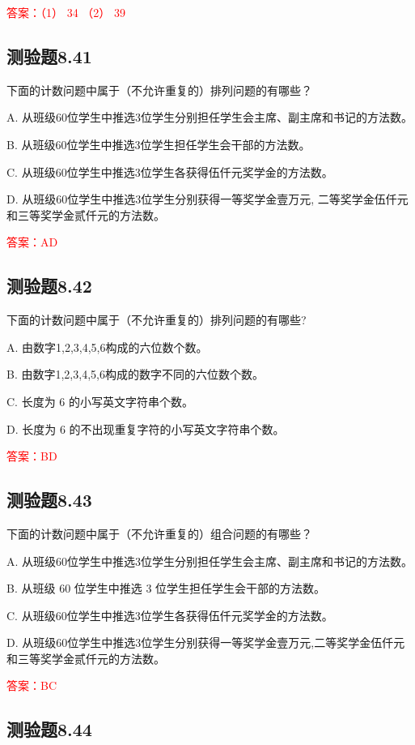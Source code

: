 \documentclass[UTF8, heading=true]{ctexart}
\begin{document}
\textcolor{red}{答案：（1） 34 （2） 39}

\subsection{测验题8.41}

下面的计数问题中属于（不允许重复的）排列问题的有哪些？

A. 从班级60位学生中推选3位学生分别担任学生会主席、副主席和书记的方法数。

B. 从班级60位学生中推选3位学生担任学生会干部的方法数。

C. 从班级60位学生中推选3位学生各获得伍仟元奖学金的方法数。

D. 从班级60位学生中推选3位学生分别获得一等奖学金壹万元, 二等奖学金伍仟元和三等奖学金贰仟元的方法数。

\textcolor{red}{答案：AD}

\subsection{测验题8.42}

下面的计数问题中属于（不允许重复的）排列问题的有哪些?

A. 由数字1,2,3,4,5,6构成的六位数个数。

B. 由数字1,2,3,4,5,6构成的数字不同的六位数个数。

C. 长度为 6 的小写英文字符串个数。

D. 长度为 6 的不出现重复字符的小写英文字符串个数。

\textcolor{red}{答案：BD}

\subsection{测验题8.43}

下面的计数问题中属于（不允许重复的）组合问题的有哪些？

A. 从班级60位学生中推选3位学生分别担任学生会主席、副主席和书记的方法数。

B. 从班级 60 位学生中推选 3 位学生担任学生会干部的方法数。

C. 从班级60位学生中推选3位学生各获得伍仟元奖学金的方法数。

D. 从班级60位学生中推选3位学生分别获得一等奖学金壹万元,二等奖学金伍仟元和三等奖学金贰仟元的方法数。

\textcolor{red}{答案：BC}

\subsection{测验题8.44}
\end{document}
